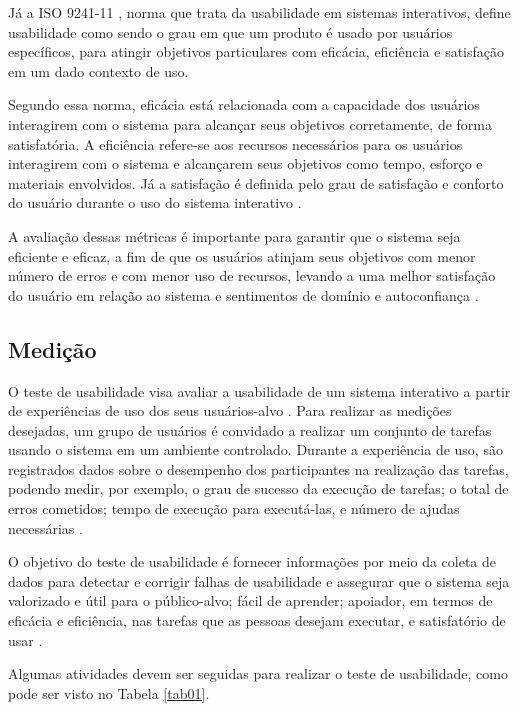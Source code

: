 Já a ISO 9241-11 \cite{iso9241}, norma que trata da usabilidade em sistemas interativos, define usabilidade como sendo o grau em que 
um produto é usado por usuários específicos, para atingir objetivos particulares com eficácia, eficiência e satisfação em um dado contexto 
de uso.

Segundo essa norma, eficácia está relacionada com a capacidade dos usuários interagirem com o sistema para alcançar seus objetivos 
corretamente, de forma satisfatória. A eficiência refere-se aos recursos necessários para os usuários interagirem 
com o sistema e alcançarem seus objetivos como tempo, esforço e materiais envolvidos. Já a satisfação é definida pelo grau de satisfação e 
conforto do usuário durante o uso do sistema interativo \cite{iso9241}.

A avaliação dessas métricas é importante para garantir que o sistema seja eficiente e eficaz, a fim de que os usuários atinjam seus objetivos 
com menor número de erros e com menor uso de recursos, levando a uma melhor satisfação do usuário em relação ao sistema e sentimentos de domínio 
e autoconfiança \cite{nielsen1994usability}.

\subsection{Medição}
\label{sec:Medição1}

O teste de usabilidade visa avaliar a usabilidade de um sistema interativo a partir de experiências de uso dos seus usuários-alvo \cite{rubin2011}. 
Para realizar as medições desejadas, um grupo de usuários é convidado a realizar um conjunto de tarefas usando o sistema em um ambiente controlado. Durante a experiência de 
uso, são registrados dados sobre o desempenho dos participantes na realização das tarefas, podendo medir, por exemplo, o grau de sucesso da execução de tarefas; o total de 
erros cometidos; tempo de execução para executá-las, e número de ajudas necessárias \cite{barbosa2010}.

O objetivo do teste de usabilidade é fornecer informações por meio da coleta de dados para detectar e corrigir falhas de usabilidade e assegurar que o sistema seja valorizado 
e útil para o público-alvo; fácil de aprender; apoiador, em termos de eficácia e eficiência, nas tarefas que as pessoas desejam executar, e satisfatório de usar \cite{rubin2011}. 

Algumas atividades devem ser seguidas para realizar o teste de usabilidade, como pode ser visto no Tabela \ref{tab01}.

